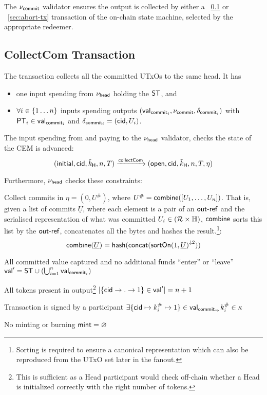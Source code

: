 \noindent The $\nu_{\mathsf{commit}}$ validator ensures the output is collected by either a \mtxCCom{}~\ref{sec:collect-tx} or \mtxAbort{}~\ref{sec:abort-tx} transaction of the on-chain state machine, selected by the appropriate redeemer.

\subsection{CollectCom Transaction}\label{sec:collect-tx}

\noindent The \mtxCCom{} transaction collects all the committed UTxOs to the same head. It has
\begin{itemize}
  \item one input spending from $\nu_\mathsf{head}$ holding the $\mathsf{ST}$, and
  \item $\forall i \in \{1 \dots n\}$ inputs spending \mtxCom{} outputs $(\mathsf{val}_{\mathsf{commit}_{i}}, \nu_{\mathsf{commit}}, \delta_{\mathsf{commit}_{i}})$ with $\mathsf{PT}_{i} \in \mathsf{val}_{\mathsf{commit}_{i}}$ and $\delta_{\mathsf{commit}_{i}} = (\mathsf{cid}, U_{i})$.
\end{itemize}
The input spending from and paying to the $\nu_\mathsf{head}$ validator, checks the state
of the CEM is advanced:
\[
   (\mathsf{initial},\mathsf{cid},\tilde{k}_{\mathsf{H}},n,T) \xrightarrow{\mathsf{collectCom}} (\mathsf{open},\mathsf{cid},\tilde{k}_{\mathsf{H}},n,T,\eta)
\]

\noindent Furthermore, $\nu_\mathsf{head}$ checks these constraints:
\begin{menumerate}
  \item Collect commits in $\eta = (0, U^{\#})$, where
  $U^{\#} = \mathsf{combine}([U_{1}, \dots, U_{n}])$. That is, given a list of commits $\underline{U}$, where each element is a pair of an $\mathsf{out\textsf{-}{}ref}$ and the serialised representation of what was committed $U_{i} \in (\mathcal{R} \times \mathbb{H})$, $\mathsf{combine}$ sorts this list by the $\mathsf{out\textsf{-}{}ref}$, concatenates all the bytes and hashes the result.\footnote{Sorting is required
    to ensure a canonical representation which can also be reproduced from the
    UTxO set later in the fanout.}: 
  \[
    \mathsf{combine}(\underline{U}) = \mathsf{hash}(\mathsf{concat}({\mathsf{sortOn}(1, \underline{U})}^{\downarrow2}))
  \]
  \item All committed value captured and no additional funds ``enter'' or ``leave''\\
  $\mathsf{val}' = \mathsf{ST} \cup (\bigcup_{i=1}^{n} \mathsf{val}_{\mathsf{commit}_{i}})$
  \item All tokens present in output\footnote{This is sufficient as a Head participant would check off-chain whether a Head is initialized correctly with the right number of tokens.}
  $|\{\mathsf{cid} \rightarrow . \rightarrow 1\} \in \mathsf{val}'| = n + 1$
  \item Transaction is signed by a participant $\exists \{\mathsf{cid} \mapsto k^{\#}_{i} \mapsto 1\} \in \mathsf{val}_{\mathsf{commit}_{\Rightarrow}} k^{\#}_{i} \in \kappa$
  \item No minting or burning  $\mathsf{mint} = \varnothing$
\end{menumerate}

